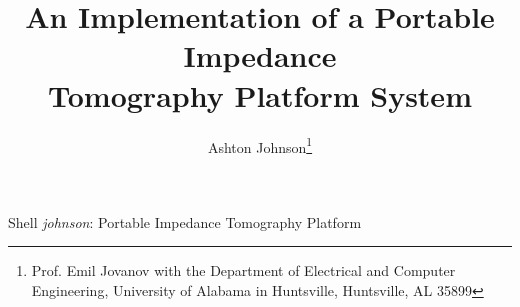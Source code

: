 \documentclass[]{IEEEtran}
\begin{document}
%
\title {An Implementation of a Portable Impedance\\Tomography Platform System}

%
%
%

\author{Ashton Johnson\thanks{Prof. Emil Jovanov with the Department of Electrical and Computer Engineering, University of Alabama in Huntsville, Huntsville, AL 35899}}%


% 
%



%
{Shell \MakeLowercase{\textit{Johnson}}: Portable Impedance Tomography Platform}
% 
\end{document}
